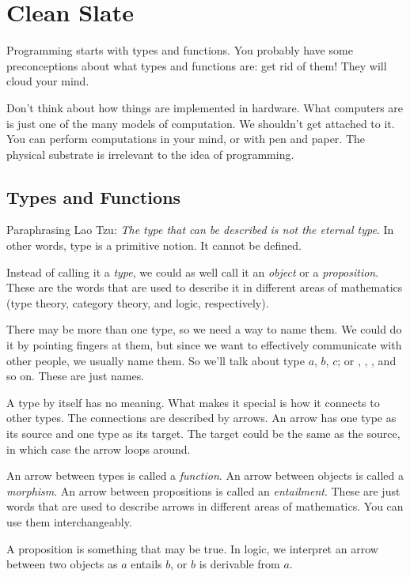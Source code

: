 \documentclass[DaoFP]{subfiles}
\begin{document}
\chapter{Clean Slate}

Programming starts with types and functions. You probably have some preconceptions about what types and functions are: get rid of them! They will cloud your mind.

Don't think about how things are implemented in hardware. What computers are is just one of the many models of computation. We shouldn't get attached to it. You can perform computations in your mind, or with pen and paper. The physical substrate is irrelevant to the idea of programming.

\section{Types and Functions}

Paraphrasing Lao Tzu: \emph{The type that can be described is not the eternal type}. In other words, type is a primitive notion. It cannot be defined.

Instead of calling it a \emph{type}, we could as well call it an \emph{object} or a \emph{proposition}. These are the words that are used to describe it in different areas of mathematics (type theory, category theory, and logic, respectively).

There may be more than one type, so we need a way to name them. We could do it by pointing fingers at them, but since we want to effectively communicate with other people, we usually name them. So we'll talk about type $a$, $b$, $c$; or , , , and so on. These are just names.

A type by itself has no meaning. What makes it special is how it connects to other types. The connections are described by arrows. An arrow has one type as its source and one type as its target. The target could be the same as the source, in which case the arrow loops around.

An arrow between types is called a \emph{function}. An arrow between objects is called a \emph{morphism}. An arrow between propositions is called an \emph{entailment}. These are just words that are used to describe arrows in different areas of mathematics. You can use them interchangeably.

A proposition is something that may be true. In logic, we interpret an arrow between two objects as $a$ entails $b$, or $b$ is derivable from $a$. 
\pagebreak
\end{document}

